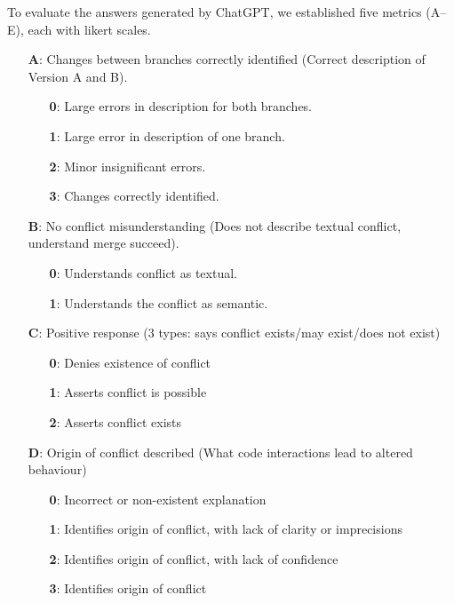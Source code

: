 To evaluate the answers generated by ChatGPT, we established five metrics (A--E), each with likert scales.
%
\begin{itemize}
  \item[\textbf{A}:] Changes between branches correctly identified (Correct description of Version A and B).
  \begin{itemize}
    \item[\textbf{0}:] Large errors in description for both branches.
    \item[\textbf{1}:] Large error in description of one branch.
    \item[\textbf{2}:] Minor insignificant errors.
    \item[\textbf{3}:] Changes correctly identified.
  \end{itemize}

  \item[\textbf{B}:] No conflict misunderstanding (Does not describe textual conflict, understand merge succeed).
  \begin{itemize}
    \item[\textbf{0}:] Understands conflict as textual.
    \item[\textbf{1}:] Understands the conflict as semantic.
  \end{itemize}

  \item[\textbf{C}:] Positive response (3 types: says conflict exists/may exist/does not exist)
  \begin{itemize}
    \item[\textbf{0}:] Denies existence of conflict
    \item[\textbf{1}:] Asserts conflict is possible
    \item[\textbf{2}:] Asserts conflict exists
  \end{itemize}

  \item[\textbf{D}:] Origin of conflict described (What code interactions lead to altered behaviour)
  \begin{itemize}
    \item[\textbf{0}:] Incorrect or non-existent explanation
    \item[\textbf{1}:] Identifies origin of conflict, with lack of clarity or imprecisions
    \item[\textbf{2}:] Identifies origin of conflict, with lack of confidence
    \item[\textbf{3}:] Identifies origin of conflict
  \end{itemize}


\end{itemize}
